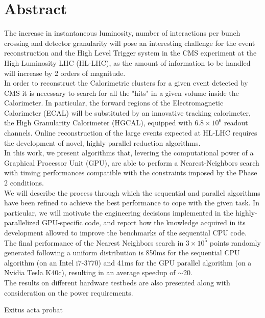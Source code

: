 \chapter*{Abstract}
\thispagestyle{empty}
The increase in instantaneous luminosity, number of interactions per bunch crossing and detector granularity will pose an interesting challenge for the event reconstruction and the High Level Trigger system in the CMS experiment at the High Luminosity LHC (HL-LHC), as the amount of information to be handled will increase by 2 orders of magnitude.\\
In order to reconstruct the Calorimetric clusters for a given event detected by CMS it is necessary to search for all the "hits" in a given volume inside the Calorimeter. In particular, the forward regions of the Electromagnetic Calorimeter (ECAL) will be substituted by an innovative tracking calorimeter, the High Granularity Calorimeter (HGCAL), equipped with $6.8\times10^6$ readout channels. Online reconstruction of the large events expected at HL-LHC requires the development of novel, highly parallel reduction algorithms.\\
In this work, we present algorithms that,  levering the computational power of a Graphical Processor Unit (GPU), are able to perform a Nearest-Neighbors search with timing performances compatible with the constraints imposed by the Phase 2 conditions.\\
We will describe the process through which the sequential and parallel algorithms have been refined to achieve the best performance to cope with the given task. In particular, we will motivate the engineering decisions implemented in the highly-parallelized GPU-specific code, and report how the knowledge acquired in its development allowed to improve the benchmarks of the sequential CPU code.\\
The final performance of the Nearest Neighbors search in $3\times10^5$ points randomly generated following a uniform distribution is 850\unit{ms} for the sequential CPU algorithm (on an Intel i7-3770) and  41\unit{ms} for the GPU parallel algorithm (on a Nvidia Tesla K40c), resulting in an average speedup of $\sim$20.\\
The results on different hardware testbeds are also presented along with consideration on the power requirements.\\

\cleardoublepage

\begin{dedication}
Exitus acta probat
\end{dedication}
\clearpage

\indici
